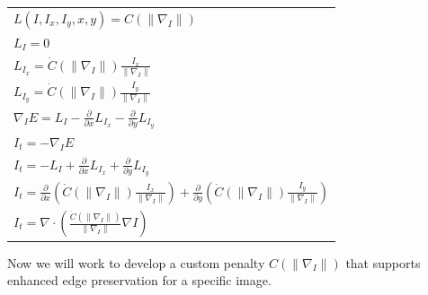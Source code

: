 \documentclass{article}
\begin{document}
  \begin{center}
    \begin{tabular}{l}
      \vspace{12pt}
      $L(I,I_{x},I_{y},x,y) = C(\| \nabla_{I} \|)$\\
      \vspace{12pt}
      $L_{I} = 0$\\
      \vspace{12pt}
      $L_{I_{x}} = \dot{C}(\| \nabla_{I} \|) \frac{I_{x}}{\| \nabla_{I} \|}$\\
      \vspace{12pt}
      $L_{I_{y}} = \dot{C}(\| \nabla_{I} \|) \frac{I_{y}}{\| \nabla_{I} \|}$\\
      \vspace{12pt}
      $\nabla_{I}E = L_{I} - \frac{\partial}{\partial x}L_{I_{x}} - \frac{\partial}{\partial y}L_{I_{y}}$\\
      \vspace{12pt}
      $I_{t} = -\nabla_{I}E$\\
      \vspace{12pt}
      $I_{t} = -L_{I} + \frac{\partial}{\partial x}L_{I_{x}} + \frac{\partial}{\partial y}L_{I_{y}}$\\
      \vspace{12pt}
      $I_{t} = \frac{\partial}{\partial x}(\dot{C}(\| \nabla_{I} \|) \frac{I_{x}}{\| \nabla_{I} \|}) + \frac{\partial}{\partial y}(\dot{C}(\| \nabla_{I} \|) \frac{I_{y}}{\| \nabla_{I} \|})$\\
      \vspace{12pt}
      $I_{t} = \nabla \cdot (\frac {\dot{C}(\| \nabla_{I} \|)}{\| \nabla_{I} \|} \nabla I)$
    \end{tabular}
  \end{center}

  \noindent
  Now we will work to develop a custom penalty $C(\| \nabla_{I}\|)$ that supports
  enhanced edge preservation for a specific image.

  \newpage
\end{document}
